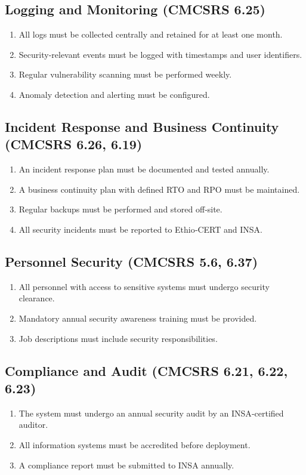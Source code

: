 \subsection{Logging and Monitoring (CMCSRS 6.25)}
\begin{enumerate}[label=\textbf{SEC-NFR-004-\arabic*.}, leftmargin=*, align=left]
    \item All logs must be collected centrally and retained for at least one month.
    \item Security‑relevant events must be logged with timestamps and user identifiers.
    \item Regular vulnerability scanning must be performed weekly.
    \item Anomaly detection and alerting must be configured.
\end{enumerate}

\subsection{Incident Response and Business Continuity (CMCSRS 6.26, 6.19)}
\begin{enumerate}[label=\textbf{SEC-NFR-005-\arabic*.}, leftmargin=*, align=left]
    \item An incident response plan must be documented and tested annually.
    \item A business continuity plan with defined RTO and RPO must be maintained.
    \item Regular backups must be performed and stored off‑site.
    \item All security incidents must be reported to Ethio‑CERT and INSA.
\end{enumerate}

\subsection{Personnel Security (CMCSRS 5.6, 6.37)}
\begin{enumerate}[label=\textbf{SEC-NFR-006-\arabic*.}, leftmargin=*, align=left]
    \item All personnel with access to sensitive systems must undergo security clearance.
    \item Mandatory annual security awareness training must be provided.
    \item Job descriptions must include security responsibilities.
\end{enumerate}

\subsection{Compliance and Audit (CMCSRS 6.21, 6.22, 6.23)}
\begin{enumerate}[label=\textbf{SEC-NFR-007-\arabic*.}, leftmargin=*, align=left]
    \item The system must undergo an annual security audit by an INSA‑certified auditor.
    \item All information systems must be accredited before deployment.
    \item A compliance report must be submitted to INSA annually.
\end{enumerate}

